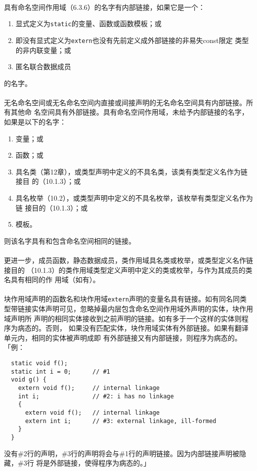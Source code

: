 \paragraph{}
具有命名空间作用域（6.3.6）的名字有内部链接，如果它是一个：
\begin{enumerate}
  \item{显式定义为\texttt{static}的变量、函数或函数模板；或}
  \item{即没有显式定义为\texttt{extern}也没有先前定义成外部链接的非易失const限定
    类型的非内联变量；或}
  \item{匿名联合数据成员}
\end{enumerate}的名字。

\paragraph{}
无名命名空间或无名命名空间内直接或间接声明的无名命名空间具有内部链接。所有其他命
名空间具有外部链接。具有命名空间作用域，未给予内部链接的名字，如果是以下的名字：
\begin{enumerate}
  \item{变量；或}
  \item{函数；或}
  \item{具名类（第12章），或类型声明中定义的不具名类，该类有类型定义名作为链接目
    的（10.1.3）；或}
  \item{具名枚举（10.2），或类型声明中定义的不具名枚举，该枚举有类型定义名作为链
    接目的（10.1.3）；或}
  \item{模板。}
\end{enumerate}则该名字具有和包含命名空间相同的链接。

\paragraph{}
更进一步，成员函数，静态数据成员，类作用域具名类或枚举，或类型定义名作链接目的
（10.1.3）的类作用域类型定义声明中定义的类或枚举，与作为其成员的类名具有相同的作
用域（如有）。

\paragraph{}
块作用域声明的函数名和块作用域\texttt{extern}声明的变量名具有链接。如有同名同类
型带链接实体声明可见，忽略掉最内层包含命名空间作用域外声明的实体，块作用域声明所
声明的相同实体接收到之前声明的链接。如有多于一个这样的实体则程序为病态的。否则，
如果没有匹配实体，块作用域实体有外部链接。如果有翻译单元内，相同的实体被声明成即
有外部链接又有内部链接，则程序为病态的。「例：
\begin{lstlisting}
  static void f();
  static int i = 0;      // #1
  void g() {
    extern void f();     // internal linkage
    int i;               // #2: i has no linkage
    {
      extern void f();   // internal linkage
      extern int i;      // #3: external linkage, ill-formed
    }
  }
\end{lstlisting}
没有\#2行的声明，\#3行的声明将会与\#1行的声明链接。因为内部链接声明被隐藏，\#3行
将是外部链接，使得程序为病态的。」

